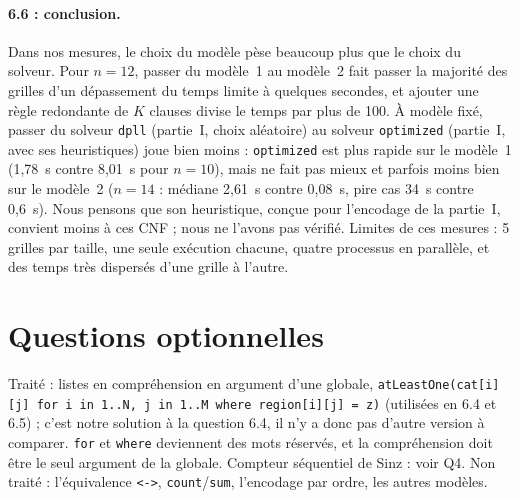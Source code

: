\documentclass[11pt,a4paper]{article}
\newcommand{\f}[1]{\texttt{#1}}
\begin{document}
\paragraph{6.6 : conclusion.} Dans nos mesures, le choix du modèle pèse beaucoup plus que le choix du solveur. Pour $n=12$, passer du modèle~1 au modèle~2 fait passer la majorité des grilles d'un dépassement du temps limite à quelques secondes, et ajouter une règle redondante de $K$ clauses divise le temps par plus de 100. À modèle fixé, passer du solveur \f{dpll} (partie~I, choix aléatoire) au solveur \f{optimized} (partie~I, avec ses heuristiques) joue bien moins : \f{optimized} est plus rapide sur le modèle~1 (1,78~s contre 8,01~s pour $n=10$), mais ne fait pas mieux et parfois moins bien sur le modèle~2 ($n=14$ : médiane 2,61~s contre 0,08~s, pire cas 34~s contre 0,6~s). Nous pensons que son heuristique, conçue pour l'encodage de la partie~I, convient moins à ces CNF ; nous ne l'avons pas vérifié. Limites de ces mesures : 5 grilles par taille, une seule exécution chacune, quatre processus en parallèle, et des temps très dispersés d'une grille à l'autre.

\section*{Questions optionnelles}

Traité : listes en compréhension en argument d'une globale, \f{atLeastOne(cat[i][j] for i in 1..N, j in 1..M where region[i][j] = z)} (utilisées en 6.4 et 6.5) ; c'est notre solution à la question 6.4, il n'y a donc pas d'autre version à comparer. \f{for} et \f{where} deviennent des mots réservés, et la compréhension doit être le seul argument de la globale. Compteur séquentiel de Sinz : voir Q4. Non traité : l'équivalence \f{<->}, \f{count}/\f{sum}, l'encodage par ordre, les autres modèles.
\end{document}
